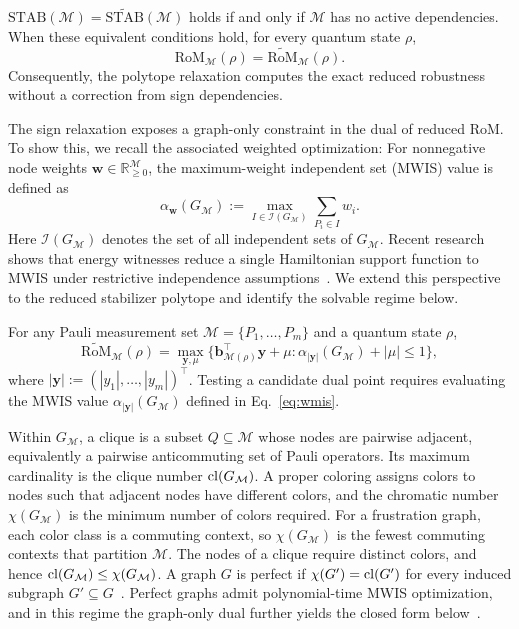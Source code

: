 \documentclass[10pt,aps,pra,twocolumn,floatfix,nofootinbib,superscriptaddress,longbibliography]{revtex4-2}
\newcommand{\Mcal}{\mathcal M}
\newcommand{\STAB}{\mathrm{STAB}}
\newcommand{\RoM}{\mathrm{RoM}}
\newcommand{\Ind}{\mathcal I}
\providecommand{\mathbm}[1]{\bm{#1}}
\begin{document}
	\begin{theorem}
		
		\label{thm:mwis}
		$\STAB(\Mcal)=\widetilde{\STAB}(\Mcal)$ holds if and only if $\Mcal$ has no active dependencies.
		When these equivalent conditions hold, for every quantum state $\rho$,
		\begin{equation}
			\RoM_\Mcal(\rho)=\widetilde{\RoM}_\Mcal(\rho).
			\label{eq:no-active-tight}
		\end{equation}
		Consequently, the polytope relaxation computes the exact reduced robustness without a correction from sign dependencies.
	\end{theorem}
	The sign relaxation exposes a graph-only constraint in the dual of reduced RoM. To show this, we recall the associated weighted optimization:
	For nonnegative node weights $\mathbm{w}\in\mathbb{R}_{\ge0}^{\Mcal}$, the maximum-weight independent set (MWIS) value is defined as~\cite{karp1972reducibility}
	\begin{equation}
		\alpha_{\mathbm{w}}(G_\Mcal):=\max_{I\in\Ind(G_\Mcal)}\sum_{P_i\in I}w_i .
		\label{eq:wmis}
	\end{equation}
	Here $\Ind(G_\Mcal)$ denotes the set of all independent sets of $G_\Mcal$. 
	Recent research shows that energy witnesses reduce a single Hamiltonian support function to MWIS under restrictive independence assumptions~\cite{macedo2026heat}. We extend this perspective to the reduced stabilizer polytope and identify the solvable regime below.
	\begin{proposition}
		
		\label{prop:relaxation}
		For any Pauli measurement set $\Mcal=\{P_1,\dots,P_m\}$ and a quantum state $\rho$,
		{\small
			\begin{equation}
				\widetilde{\RoM}_\Mcal(\rho)=\max_{\mathbm{y},\mu}\Big\{\mathbm{b}_{\Mcal(\rho)}^\top \mathbm{y}+\mu: \alpha_{|\mathbm{y}|}(G_\Mcal)+|\mu|\le 1\Big\},
				\label{eq:dual-relaxed}
			\end{equation}
		}
		where $|\mathbm{y}|:=(|y_1|,\dots,|y_m|)^\top$. Testing a candidate dual point requires evaluating the MWIS value $\alpha_{|\mathbm{y}|}(G_\Mcal)$ defined in Eq.~\eqref{eq:wmis}. 
	\end{proposition}
	Within $G_\Mcal$, a clique is a subset $Q\subseteq\Mcal$ whose nodes are pairwise adjacent, equivalently a pairwise anticommuting set of Pauli operators. Its maximum cardinality is the clique number $\clnum(G_\Mcal)$.
	A proper coloring assigns colors to nodes such that adjacent nodes have different colors, and the chromatic number $\chi(G_\Mcal)$ is the minimum number of colors required. For a frustration graph, each color class is a commuting context, so $\chi(G_\Mcal)$ is the fewest commuting contexts that partition $\Mcal$.
	The nodes of a clique require distinct colors, and hence $\clnum(G_\Mcal)\le\chi(G_\Mcal)$. A graph $G$ is perfect if $\chi(G')=\operatorname{cl}(G')$ for every induced subgraph $G'\subseteq G$~\cite{chudnovsky2006strong}.
	Perfect graphs admit polynomial-time MWIS optimization, and in this regime the graph-only dual further yields the closed form below~\cite{lovasz1972normal,lovasz1972characterization,lovasz1979shannon,grotschel1981ellipsoid,grotschel1988geometric,chvatal1975certain}.
	
\end{document}
